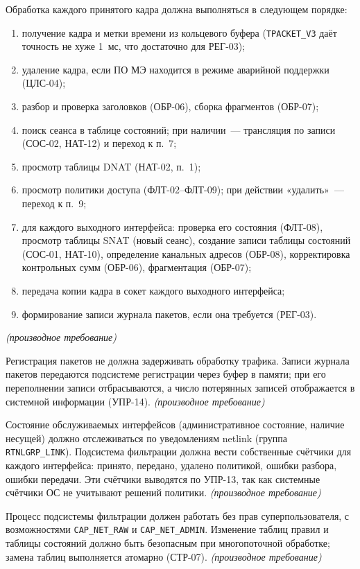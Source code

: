 \documentclass[12pt,a4paper,final]{article}
\newenvironment{reqs}
  {\begin{description}[style=sameline,leftmargin=2.2cm,labelwidth=2.0cm,
     labelsep=0.2cm,font=\normalfont\bfseries,itemsep=3pt]}
  {\end{description}}
\newcommand{\der}{\textit{(производное требование)}}
\begin{document}
\begin{reqs}
\item[ОБР-09] Обработка каждого принятого кадра должна выполняться в
  следующем порядке:
  \begin{enumerate}
  \item получение кадра и метки времени из кольцевого буфера
    (\texttt{TPACKET\_V3} даёт точность не хуже 1~мс, что достаточно
    для РЕГ-03);
  \item удаление кадра, если ПО МЭ находится в режиме аварийной поддержки
    (ЦЛС-04);
  \item разбор и проверка заголовков (ОБР-06), сборка фрагментов (ОБР-07);
  \item поиск сеанса в таблице состояний; при наличии~— трансляция по записи
    (СОС-02, НАТ-12) и переход к п.~7;
  \item просмотр таблицы DNAT (НАТ-02, п.~1);
  \item просмотр политики доступа (ФЛТ-02--ФЛТ-09); при действии «удалить»~—
    переход к п.~9;
  \item для каждого выходного интерфейса: проверка его состояния (ФЛТ-08),
    просмотр таблицы SNAT (новый сеанс), создание записи таблицы состояний
    (СОС-01, НАТ-10), определение канальных адресов (ОБР-08), корректировка
    контрольных сумм (ОБР-06), фрагментация (ОБР-07);
  \item передача копии кадра в сокет каждого выходного интерфейса;
  \item формирование записи журнала пакетов, если она требуется (РЕГ-03).
  \end{enumerate}
  \der

\item[ОБР-10] Регистрация пакетов не должна задерживать обработку трафика.
  Записи журнала пакетов передаются подсистеме регистрации через
  буфер в памяти; при его переполнении записи отбрасываются, а число
  потерянных записей отображается в системной информации (УПР-14). \der

\item[ОБР-11] Состояние обслуживаемых интерфейсов (административное
  состояние, наличие несущей) должно отслеживаться по уведомлениям netlink
  (группа \texttt{RTNLGRP\_LINK}). Подсистема фильтрации должна вести
  собственные счётчики для каждого интерфейса: принято, передано, удалено
  политикой, ошибки разбора, ошибки передачи. Эти счётчики выводятся по
  УПР-13, так как системные счётчики ОС не учитывают решений политики. \der

\item[ОБР-12] Процесс подсистемы фильтрации должен работать без прав
  суперпользователя, с возможностями \texttt{CAP\_NET\_RAW} и
  \texttt{CAP\_NET\_ADMIN}. Изменение таблиц правил и таблицы состояний
  должно быть безопасным при многопоточной обработке; замена таблиц
  выполняется атомарно (СТР-07). \der


\end{reqs}
\end{document}

